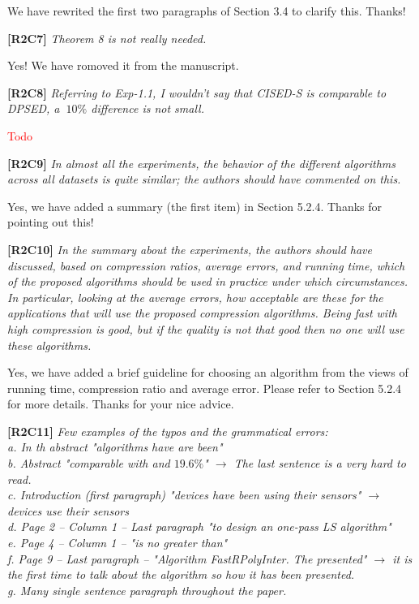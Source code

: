 \documentclass{letter}
\begin{document}
We have rewrited the first two paragraphs of Section 3.4 to clarify this. Thanks!

\textbf{[R2C7]} \emph{Theorem 8 is not really needed.}

Yes! We have romoved it from the manuscript.

\textbf{[R2C8]} \emph{Referring to Exp-1.1, I wouldn't say that CISED-S is comparable to DPSED, a $~10\%$ difference is not small.}

\textcolor{red}{Todo}

\textbf{[R2C9]} \emph{In almost all the experiments, the behavior of the different algorithms across all datasets is quite similar; the authors should have commented on this.}

Yes, we have added a summary (the first item) in Section 5.2.4. Thanks for pointing out this!

\textbf{[R2C10]} \emph{In the summary about the experiments, the authors should have discussed, based on compression ratios, average errors, and running time, which of the proposed algorithms should be used in practice under which circumstances. In particular, looking at the average errors, how acceptable are these for the applications that will use the proposed compression algorithms. Being fast with high compression is good, but if the quality is not that good then no one will use these algorithms.}

Yes, we have added a brief guideline for choosing an algorithm from the views of running time, compression ratio and average error. Please refer to Section 5.2.4 for more details. Thanks for your nice advice.

\textbf{[R2C11]} \emph{Few examples of the typos and the grammatical errors: \\
   a. In th abstract "algorithms have are been"	\\
   b. Abstract "comparable with and $19.6\%$" $\rightarrow$ The last sentence is a very hard to read.	\\
   c. Introduction (first paragraph) "devices have been using their sensors" $\rightarrow$ devices use their sensors	\\
   d. Page 2 -- Column 1 -- Last paragraph "to design an one-pass LS algorithm" \\
   e. Page 4 -- Column 1 -- "is no greater than" \\
   f. Page 9 -- Last paragraph -- "Algorithm FastRPolyInter. The presented" $\rightarrow$ it is the first time to talk about the algorithm so how it has been presented. \\
   g. Many single sentence paragraph throughout the paper. 
}
\end{document}
